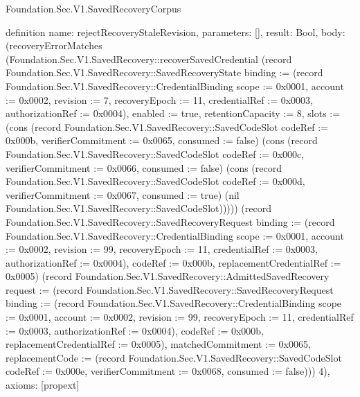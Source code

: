 \begin{lexlean}{Foundation.Sec.V1.SavedRecoveryCorpus}
\begin{semanticmodule}
definition{
  name: rejectRecoveryStaleRevision,
  parameters: [],
  result: Bool,
  body: (recoveryErrorMatches (Foundation.Sec.V1.SavedRecovery::recoverSavedCredential (record Foundation.Sec.V1.SavedRecovery::SavedRecoveryState {binding := (record Foundation.Sec.V1.SavedRecovery::CredentialBinding {scope := 0x0001, account := 0x0002, revision := 7, recoveryEpoch := 11, credentialRef := 0x0003, authorizationRef := 0x0004}), enabled := true, retentionCapacity := 8, slots := (cons (record Foundation.Sec.V1.SavedRecovery::SavedCodeSlot {codeRef := 0x000b, verifierCommitment := 0x0065, consumed := false}) (cons (record Foundation.Sec.V1.SavedRecovery::SavedCodeSlot {codeRef := 0x000c, verifierCommitment := 0x0066, consumed := false}) (cons (record Foundation.Sec.V1.SavedRecovery::SavedCodeSlot {codeRef := 0x000d, verifierCommitment := 0x0067, consumed := true}) (nil Foundation.Sec.V1.SavedRecovery::SavedCodeSlot))))}) (record Foundation.Sec.V1.SavedRecovery::SavedRecoveryRequest {binding := (record Foundation.Sec.V1.SavedRecovery::CredentialBinding {scope := 0x0001, account := 0x0002, revision := 99, recoveryEpoch := 11, credentialRef := 0x0003, authorizationRef := 0x0004}), codeRef := 0x000b, replacementCredentialRef := 0x0005}) (record Foundation.Sec.V1.SavedRecovery::AdmittedSavedRecovery {request := (record Foundation.Sec.V1.SavedRecovery::SavedRecoveryRequest {binding := (record Foundation.Sec.V1.SavedRecovery::CredentialBinding {scope := 0x0001, account := 0x0002, revision := 99, recoveryEpoch := 11, credentialRef := 0x0003, authorizationRef := 0x0004}), codeRef := 0x000b, replacementCredentialRef := 0x0005}), matchedCommitment := 0x0065, replacementCode := (record Foundation.Sec.V1.SavedRecovery::SavedCodeSlot {codeRef := 0x000e, verifierCommitment := 0x0068, consumed := false})})) 4),
  axioms: [propext]
}


\end{semanticmodule}
\end{lexlean}
